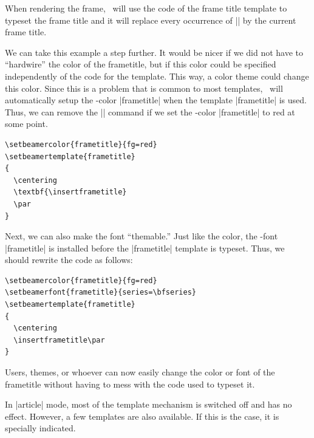 When rendering the frame, \beamer\ will use the code of the frame title template to typeset the frame title and it will replace every occurrence of |\insertframetitle| by the current frame title.

We can take this example a step further. It would be nicer if we did not have to ``hardwire'' the color of the frametitle, but if this color could be specified independently of the code for the template. This way, a color theme could change this color. Since this is a problem that is common to most templates, \beamer\ will automatically setup the \beamer-color |frametitle| when the template |frametitle| is used. Thus, we can remove the |\color{red}| command if we set the \beamer-color |frametitle| to red at some point.

\begin{verbatim}
\setbeamercolor{frametitle}{fg=red}
\setbeamertemplate{frametitle}
{
  \centering
  \textbf{\insertframetitle}
  \par
}
\end{verbatim}

Next, we can also make the font ``themable.'' Just like the color, the \beamer-font |frametitle| is installed before the |frametitle| template is typeset. Thus, we should rewrite the code as follows:

\begin{verbatim}
\setbeamercolor{frametitle}{fg=red}
\setbeamerfont{frametitle}{series=\bfseries}
\setbeamertemplate{frametitle}
{
  \centering
  \insertframetitle\par
}
\end{verbatim}

Users, themes, or whoever can now easily change the color or font of the frametitle without having to mess with the code used to typeset it.

\articlenote
In |article| mode, most of the template mechanism is switched off and has no effect. However, a few templates are also available. If this is the case, it is specially indicated.
\smallskip

